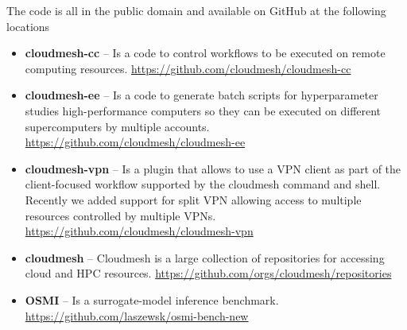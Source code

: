 \documentclass[utf8]{FrontiersinVancouver} %
\begin{document}
The code is all in the public domain and available on GitHub at the following locations

\begin{itemize}

\item {\bf cloudmesh-cc} -- Is a code to control workflows to be executed on
  remote computing
  resources. \url{https://github.com/cloudmesh/cloudmesh-cc}

\item {\bf cloudmesh-ee} -- Is a code to generate batch scripts for
  hyperparameter studies high-performance computers so they can be
  executed on different supercomputers by multiple
  accounts. \url{https://github.com/cloudmesh/cloudmesh-ee}


\item {\bf cloudmesh-vpn} -- Is a plugin that allows to use a VPN client as part of the client-focused workflow supported by the cloudmesh command and shell. Recently we added support for split VPN allowing access to multiple resources controlled by multiple VPNs.
\url{https://github.com/cloudmesh/cloudmesh-vpn}

\item {\bf cloudmesh} -- Cloudmesh is a large collection of repositories for
  accessing cloud and HPC
  resources. \url{https://github.com/orgs/cloudmesh/repositories}

\item {\bf OSMI} -- Is a surrogate-model inference benchmark. \url{https://github.com/laszewsk/osmi-bench-new}



\end{itemize}







% 



\end{document}
